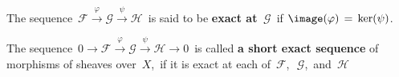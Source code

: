 \begin{itemize}
	The sequence
	\,$\mathscr{F} \overset{\varphi}{\longrightarrow} \mathscr{G} \overset{\psi}{\longrightarrow} \mathscr{H}$\,
	is said to be \textbf{exact at \,$\mathscr{G}$\,} if
	$\image(\varphi) \,=\, \ker(\psi)$.

	The sequence
	\,$
	0 \longrightarrow \mathscr{F}
	\overset{\varphi}{\longrightarrow} \mathscr{G}
	\overset{\psi}{\longrightarrow} \mathscr{H}
	\longrightarrow
	0
	$\,
	is called \textbf{a short exact sequence} of morphisms of sheaves over \,$X$,\,
	if it is exact at each of
	\,$\mathscr{F}$,\,
	\,$\mathscr{G}$,\, and
	\,$\mathscr{H}$\,
\end{itemize}

